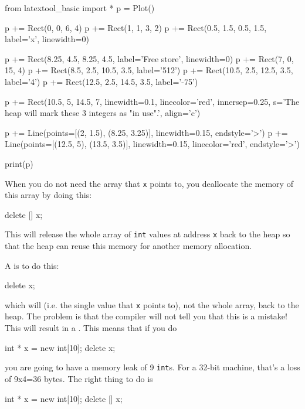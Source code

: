 \begin{python}
from latextool_basic import *
p = Plot()

p += Rect(0, 0, 6, 4)
p += Rect(1, 1, 3, 2)
p += Rect(0.5, 1.5, 0.5, 1.5, label='x', linewidth=0)

p += Rect(8.25, 4.5, 8.25, 4.5, label='Free store', linewidth=0)
p += Rect(7, 0, 15, 4)
p += Rect(8.5, 2.5, 10.5, 3.5, label='512')
p += Rect(10.5, 2.5, 12.5, 3.5, label='4')
p += Rect(12.5, 2.5, 14.5, 3.5, label='-75')

p += Rect(10.5, 5, 14.5, 7, linewidth=0.1, linecolor='red', innersep=0.25, s='The heap will mark these 3 integers as "in use".', align='c')

p += Line(points=[(2, 1.5), (8.25, 3.25)], linewidth=0.15, endstyle='>')
p += Line(points=[(12.5, 5), (13.5, 3.5)], linewidth=0.15, linecolor='red', endstyle='>')

print(p)
\end{python}

When you do not need the array that \texttt{x} points to, you deallocate
the memory of this array by doing this:

\begin{consolethree}[escapeinside=||]
delete [] x;
\end{consolethree}

This will release the whole array of \texttt{int} values at address \texttt{x} back to the heap so that the heap can reuse this memory for another memory allocation.

A  is to do this:

\begin{consolethree}[escapeinside=||]
delete x;
\end{consolethree}

which will  (i.e. the single value that \texttt{x} points to), not the whole array, back to the heap. The problem is that the compiler will not tell you that this is a mistake! This will result in a . This means that if you do

\begin{consolethree}[escapeinside=||]
int * x = new int[10];
delete x;
\end{consolethree}

you are going to have a memory leak of 9 \texttt{int}s. For a 32-bit
machine, that's a loss of 9x4=36 bytes. The right thing
to do is

\begin{consolethree}[escapeinside=||]
int * x = new int[10];
delete [] x;
\end{consolethree}

